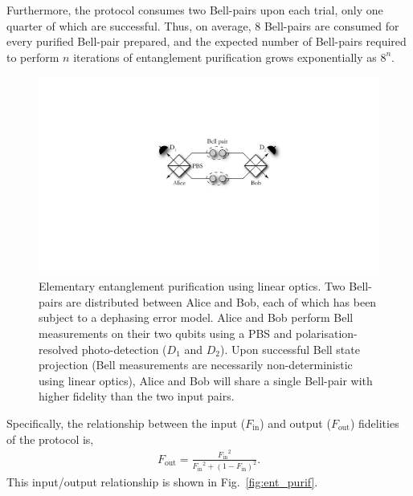 \documentclass[aps, rmp, twocolumn, amsmath, amssymb, nofootinbib, superscriptaddress, longbibliography, floatfix, table-of-contents, eqsecnum]{revtex4-1}
\begin{document}
Furthermore, the protocol consumes two Bell-pairs upon each trial, only one quarter of which are successful. Thus, on average, 8 Bell-pairs are consumed for every purified Bell-pair prepared, and the expected number of Bell-pairs required to perform $n$ iterations of entanglement purification grows exponentially as $8^n$.

\begin{figure}[!htb]
\includegraphics[width=0.9\columnwidth]{ent_purif_prot}
\caption{Elementary entanglement purification using linear optics. Two Bell-pairs are distributed between Alice and Bob, each of which has been subject to a dephasing error model. Alice and Bob perform Bell measurements on their two qubits using a PBS and polarisation-resolved photo-detection ($D_1$ and $D_2$). Upon successful Bell state projection (Bell measurements are necessarily non-deterministic using linear optics), Alice and Bob will share a single Bell-pair with higher fidelity than the two input pairs.} \label{fig:ent_purif_prot}
\end{figure}

Specifically, the relationship between the input ($F_\text{in}$) and output ($F_\text{out}$) fidelities of the protocol is,
\begin{align}
F_\text{out} = \frac{{F_\text{in}}^2}{{F_\text{in}}^2 + (1-F_\text{in})^2}.
\end{align}
This input/output relationship is shown in Fig.~\ref{fig:ent_purif}.
\end{document}
